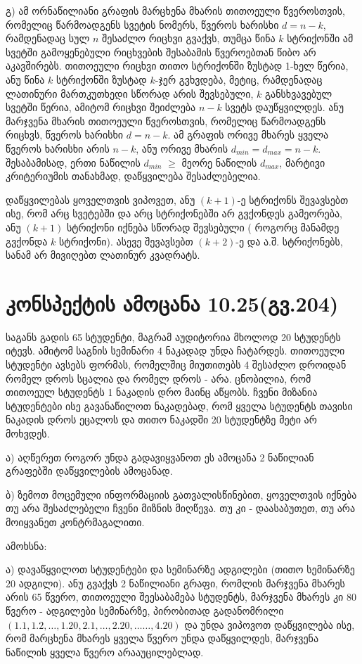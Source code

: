 \documentclass[a4paper, 11pt]{article}
\begin{document}
\begin{sloppypar}
გ) 
ამ ორნაწილიანი გრაფის მარცხენა მხარის თითოეული წვეროსთვის, რომელიც წარმოადგენს სვეტის ნომერს, წვეროს ხარისხი $d = n - k$, რამდენადაც სულ $n$ შესაძლო რიცხვი გვაქვს, თუმცა წინა $k$ სტრიქონში ამ სვეტში გამოყენებული რიცხვების შესაბამის წვეროებთან წიბო არ  აკავშირებს. თითოეული რიცხვი თითო სტრიქონში ზუსტად 1-ხელ წერია, ანუ წინა $k$ სტრიქონში ზუსტად $k$-ჯერ გვხვდება, მეტიც, რამდენადაც ლათინური მართკუთხედი სწორად არის შევსებული, $k$ განსხვავებულ სვეტში წერია, ამიტომ რიცხვი შეიძლება $n-k$ სვეტს დაუწყვილდეს. ანუ მარჯვენა მხარის თითოეული წვეროსთვის, რომელიც წარმოადგენს რიცხვს, წვეროს ხარისხი $d = n - k$. 
ამ გრაფის ორივე მხარეს ყველა წვეროს ხარისხი არის $n - k$, ანუ ორივე მხარის $d_{min} = d_{max} = n - k$. შესაბამისად, ერთი ნაწილის $d_{min}$ $\geq$ მეორე ნაწილის $d_{max}$, მარტივი კრიტერიუმის თანახმად, დაწყვილება შესაძლებელია.

დაწყვილებას ყოველთვის ვიპოვეთ, ანუ $(k+1)$-ე სტრიქონს შევავსებთ ისე, რომ არც სვეტებში და არც სტრიქონებში არ გვქონდეს გამეორება, ანუ $(k+1)$ სტრიქონი
იქნება სწორად შევსებული ( როგორც მანამდე გვქონდა $k$ სტრიქონი). ასევე შევავსებთ $(k+2)$-ე და ა.შ. სტრიქონებს, სანამ არ მივიღებთ ლათინურ კვადრატს.

\section{კონსპექტის ამოცანა 10.25(გვ.204)}

საგანს გადის 65 სტუდენტი, მაგრამ აუდიტორია მხოლოდ 20 სტუდენტს იტევს. ამიტომ საგნის სემინარი 4 ნაკადად უნდა ჩატარდეს. თითოეული სტუდენტი ავსებს ფორმას, რომელშიც მიუთითებს 4 შესაძლო დროიდან რომელ დროს სცალია და რომელ დროს - არა. ცნობილია, რომ თითოეულ სტუდენტს 1 ნაკადის დრო მაინც აწყობს. ჩვენი მიზანია სტუდენტები ისე გავანაწილოთ ნაკადებად, რომ ყველა სტუდენტს თავისი ნაკადის დროს ეცალოს და თითო ნაკადში 20 სტუდენტზე მეტი არ მოხვდეს.

ა) აღწერეთ როგორ უნდა გადავიყვანოთ ეს ამოცანა 2 ნაწილიან გრაფებში დაწყვილების ამოცანად.

ბ) ზემოთ მოცემული ინფორმაციის გათვალისწინებით, ყოველთვის იქნება თუ არა შესაძლებელი ჩვენი მიზნის მიღწევა. თუ კი - დაასაბუთეთ, თუ არა მოიყვანეთ კონტრმაგალითი.

{
ამოხსნა:
}

ა) დავაწყვილოთ სტუდენტები და სემინარზე ადგილები (თითო სემინარზე 20 ადგილი). ანუ გვაქვს 2 ნაწილიანი გრაფი, რომლის მარჯვენა მხარეს არის 65 წვერო, თითოეული შეესაბამება სტუდენტს, მარჯვენა მხარეს კი 80 წვერო - ადგილები სემინარზე, პირობითად გადანომრილი $(1.1, 1.2, \dots,1.20, 2.1, \dots, 2.20, \dots \dots, 4.20)$ და უნდა ვიპოვოთ დაწყვილება ისე, რომ მარცხენა მხარეს ყველა წვერო უნდა დაწყვილდეს, მარჯვენა ნაწილის ყველა წვერო არააუცილებლად. 


\end{sloppypar}
\end{document}
